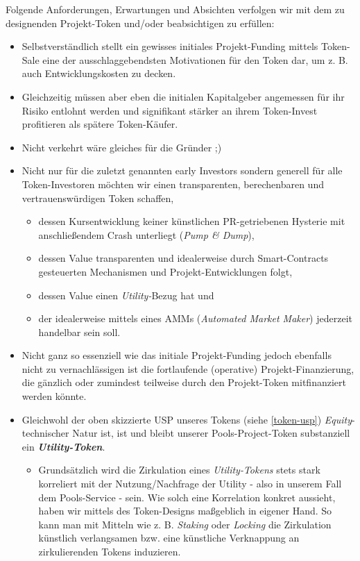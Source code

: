 \begin{Assumption}
\label{token-anforderungen}
\vspace{0.2cm}

Folgende Anforderungen, Erwartungen und Absichten verfolgen wir mit dem zu designenden Projekt-Token und/oder beabsichtigen zu erfüllen:

\begin{itemize}
	\item Selbstverständlich stellt ein gewisses initiales Projekt-Funding mittels Token-Sale eine der ausschlaggebendsten Motivationen für den Token dar, um z. B. auch Entwicklungskosten zu decken. 
	\item Gleichzeitig müssen aber eben die initialen Kapitalgeber angemessen für ihr Risiko entlohnt werden und signifikant stärker an ihrem Token-Invest profitieren als spätere Token-Käufer.
	\item Nicht verkehrt wäre gleiches für die Gründer ;)
	\item Nicht nur für die zuletzt genannten early Investors sondern generell für alle Token-Investoren möchten wir einen transparenten, berechenbaren und vertrauenswürdigen Token schaffen, 
	\begin{itemize}
		\item dessen Kursentwicklung keiner künstlichen PR-getriebenen Hysterie mit anschließendem Crash unterliegt (\textit{Pump \& Dump}),
		\item dessen Value transparenten und idealerweise durch Smart-Contracts ge\-steuerten Mechanismen und Projekt-Entwicklungen folgt,
		\item dessen Value einen \textit{Utility-}Bezug hat und
		\item der idealerweise mittels eines AMMs (\textit{Automated Market Maker}) jederzeit handelbar sein soll.
	\end{itemize}
	\item Nicht ganz so essenziell wie das initiale Projekt-Funding jedoch ebenfalls nicht zu vernachlässigen ist die fortlaufende (operative) Projekt-Finanzierung, die gänzlich oder zumindest teilweise durch den Projekt-Token mitfinanziert werden könnte.
	\item Gleichwohl der oben skizzierte USP unseres Tokens (siehe \ref{token-usp}) \textit{Equity}-techni\-scher Natur ist, ist und bleibt unserer Pools-Project-Token substanziell ein \textbf{\textit{Utility-Token}}.
	\begin{itemize}
		\item Grundsätzlich wird die Zirkulation eines \textit{Utility-Tokens} stets stark korreliert mit der Nutzung/Nachfrage der Utility - also in unserem Fall dem Pools-Service - sein. Wie solch eine Korrelation konkret aussieht, haben wir mittels des Token-Designs maßgeblich in eigener Hand. So kann man mit Mitteln wie z. B. \textit{Staking} oder \textit{Locking} die Zirkulation künstlich verlangsamen bzw. eine künstliche Verknappung an zirkulierenden Tokens induzieren.

\end{itemize}
\end{itemize}
\end{Assumption}
